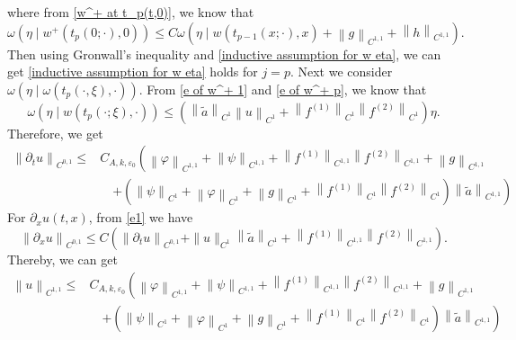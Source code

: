 \documentclass[a4paper,reqno,11pt]{amsart}
\numberwithin{equation}{section} %
\begin{document}
where from \eqref{w^+ at t_p(t,0)}, we know that
$$
\omega \left( \eta \mid w^+\left( t_p\left( 0;\cdot \right) ,0 \right) \right) \leq C \omega \left( \eta \mid w\left( t_{p-1}\left( x;\cdot \right) ,x \right) +\left\| g \right\| _{C^{1,1}}+\left\| h \right\| _{C^{1,1}} \right)  .
$$
Then using Gronwall's inequality and \eqref{inductive assumption for w eta}, we can get \eqref{inductive assumption for w eta} holds for $j=p$.
Next we consider $\omega\left(\eta \mid \omega\left(t_p(\cdot, \xi), \cdot\right)\right)$.
From \eqref{e of w^+ 1} and \eqref{e of w^+ p}, we know that
$$
\omega \left( \eta \mid w\left( t_p(\cdot ;\xi ),\cdot \right) \right) \leq \left( \left\| \tilde{a} \right\| _{C^1}\left\lVert u\right\rVert  _{C^1}+\left\| f^{(1)} \right\| _{C^1}\left\| f^{(2)} \right\| _{C^1} \right) \eta .
$$
Therefore, we get
\begin{equation}
\begin{aligned}
\left\| \partial _t u \right\| _{C^{0,1}}\leq&  C_{A,k,\varepsilon _0}\left( \left\| \varphi \right\| _{C^{1,1}}+\left\| \psi \right\| _{C^{1,1}}+\left\| f^{(1)} \right\| _{C^{1,1}}\left\| f^{(2)} \right\| _{C^{1,1}}+\left\| g \right\| _{C^{1,1}}\right.\\
&\quad \left.+(\left\| \psi \right\| _{C^1}+\left\| \varphi \right\| _{C^1}+\left\| g \right\| _{C^1}+\left\| f^{(1)} \right\| _{C^1}\left\| f^{(2)} \right\| _{C^1})\left\| \tilde{a} \right\| _{C^{1,1}} \right) 
\end{aligned}
\end{equation}
For $\partial _xu(t,x)$, from \eqref{e1} we have
$$
\left\| \partial _xu \right\| _{C^{0,1}}\leq C\left( \left\| \partial _tu \right\| _{C^{0,1}}+\parallel u\parallel _{C^1}\left\| \tilde{a} \right\| _{C^1}+\left\| f^{(1)} \right\| _{C^{1,1}}\left\| f^{(2)} \right\| _{C^{1,1}} \right) .
$$
Thereby, we can get
\begin{equation}\label{continuity paradigm}
\begin{aligned}
\left\| u \right\| _{C^{1,1}}\leq & C_{A,k,\varepsilon _0}\left( \left\| \varphi \right\| _{C^{1,1}}+\left\| \psi \right\| _{C^{1,1}}+\left\| f^{(1)} \right\| _{C^{1,1}}\left\| f^{(2)} \right\| _{C^{1,1}}+\left\| g \right\| _{C^{1,1}}\right.\\
&\quad \left.+(\left\| \psi \right\| _{C^1}+\left\| \varphi \right\| _{C^1}+\left\| g \right\| _{C^1}+\left\| f^{(1)} \right\| _{C^1}\left\| f^{(2)} \right\| _{C^1})\left\| \tilde{a} \right\| _{C^{1,1}} \right) 
\end{aligned}
\end{equation}
\end{document}
